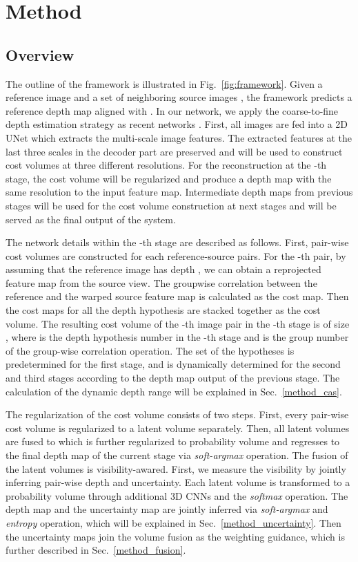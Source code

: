 \documentclass{bmvc2k}
\begin{document}
\section{Method}


\subsection{Overview}\label{method_overview}
The outline of the framework is illustrated in Fig.\ \ref{fig:framework}. Given a reference image  and a set of neighboring source images , the framework predicts a reference depth map  aligned with . In our network, we apply the coarse-to-fine depth estimation strategy as recent networks \cite{gu2020cascade}. First, all images are fed into a 2D UNet \cite{ronneberger2015u} which extracts the multi-scale image features. The extracted features at the last three scales in the decoder part are preserved and will be used to construct cost volumes at three different resolutions. For the reconstruction at the -th stage, the cost volume will be regularized and produce a depth map  with the same resolution to the input feature map. Intermediate depth maps from previous stages will be used for the cost volume construction at next stages and  will be served as the final output  of the system.

The network details within the -th stage are described as follows. First, pair-wise cost volumes are constructed for each reference-source pairs. 
For the -th pair, by assuming that the reference image has depth , we can obtain a reprojected feature map  from the source view. The groupwise correlation \cite{guo2019group} between the reference and the warped source feature map is calculated as the cost map. Then the cost maps for all the depth hypothesis are stacked together as the cost volume. The resulting cost volume  of the -th image pair in the -th stage is of size , where  is the depth hypothesis number in the -th stage and  is the group number of the group-wise correlation operation.
The set of the hypotheses is predetermined for the first stage, and is dynamically determined for the second and third stages according to the depth map output of the previous stage. The calculation of the dynamic depth range will be explained in Sec.\ \ref{method_cas}. 


The regularization of the cost volume consists of two steps. First, every pair-wise cost volume is regularized to a latent volume  separately. Then, all latent volumes are fused to  which is further regularized to probability volume  and regresses to the final depth map of the current stage  via \textit{soft-argmax} \cite{kendall2017end} operation. The fusion of the latent volumes is visibility-awared. First, we measure the visibility by jointly inferring pair-wise depth and uncertainty. Each latent volume is transformed to a probability volume  through additional 3D CNNs and the \textit{softmax} operation. The depth map  and the uncertainty map  are jointly inferred via \textit{soft-argmax} and \textit{entropy} operation, which will be explained in Sec.\ \ref{method_uncertainty}. Then the uncertainty maps join the volume fusion as the weighting guidance, which is further described in Sec.\ \ref{method_fusion}.
\end{document}

